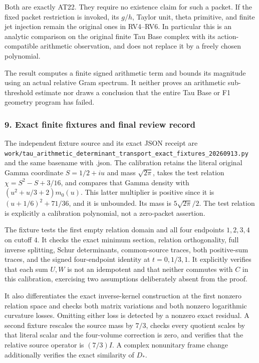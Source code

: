 Both are exactly AT22. They require no existence claim for such a packet. If the fixed packet restriction is invoked, its \(g/h\), Taylor unit, theta primitive, and finite jet injection remain the original ones in RV4--RV6. In particular this is an analytic comparison on the original finite Tau Base complex with its action-compatible arithmetic observation, and does not replace it by a freely chosen polynomial.

The result computes a finite signed arithmetic term and bounds its magnitude using an actual relative Gram spectrum. It neither proves an arithmetic sub-threshold estimate nor draws a conclusion that the entire Tau Base or F1 geometry program has failed.

\subsubsection{9. Exact finite fixtures and final review record}\label{endpoint-determinant_review--exact-finite-fixtures-and-final-review-record}

The independent fixture source and its exact JSON receipt are \nolinkurl{work/tau_arithmetic_determinant_transport_exact_fixtures_20260913.py} and the same basename with .json. The calibration retains the literal original Gamma coordinate \(S=1/2+iu\) and mass \(\sqrt{2\pi}\), takes the test relation \(\chi=S^2-S+3/16\), and compares that Gamma density with \((u^2+u/3+2)m_0(u)\). This latter multiplier is positive since it is \((u+1/6)^2+71/36\), and it is unbounded. Its mass is \(5\sqrt{2\pi}/2\). The test relation is explicitly a calibration polynomial, not a zero-packet assertion.

The fixture tests the first empty relation domain and all four endpoints \(1,2,3,4\) on cutoff \(4\). It checks the exact minimum section, relation orthogonality, full inverse splitting, Schur determinants, common-source traces, both positive-sum traces, and the signed four-endpoint identity at \(t=0,1/3,1\). It explicitly verifies that each sum \(U,W\) is not an idempotent and that neither commutes with \(C\) in this calibration, exercising two assumptions deliberately absent from the proof.

It also differentiates the exact inverse-kernel construction at the first nonzero relation space and checks both matrix variations and both nonzero logarithmic curvature losses. Omitting either loss is detected by a nonzero exact residual. A second fixture rescales the source mass by \(7/3\), checks every quotient scales by that literal scalar and the four-volume correction is zero, and verifies that the relative source operator is \((7/3)I\). A complex nonunitary frame change additionally verifies the exact similarity of \(D_*\).

